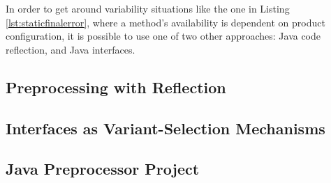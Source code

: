 In order to get around \gls{variability} situations like the one in Listing \ref{lst:staticfinalerror}, where a method's availability is dependent on product configuration, it is possible to use one of two other approaches: Java code reflection, and Java interfaces.


\subsection{Preprocessing with Reflection}
\label{sc:reflection}


\subsection{Interfaces as Variant-Selection Mechanisms}
\label{sc:interfaces}


\subsection{Java Preprocessor Project}
\label{sc:prepros}


